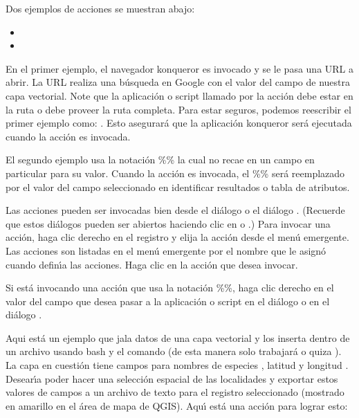 Dos ejemplos de acciones se muestran abajo:

\begin{itemize}
  \item {}
  \item {}
\end{itemize}

En el primer ejemplo, el navegador konqueror es invocado y  se le pasa una URL a 
abrir. La URL realiza una b\'usqueda en Google con el valor del campo 
de nuestra capa vectorial. Note que la aplicaci\'on o script llamado por la acci\'on
debe estar en la ruta o debe proveer la  ruta completa. Para estar seguros, podemos
reescribir el primer ejemplo como: . Esto asegurar\'a que la aplicaci\'on konqueror
ser\'a ejecutada cuando la acci\'on es invocada.

El segundo ejemplo usa la notaci\'on \%\% la cual no recae en un campo en particular
para su valor. Cuando la acci\'on es invocada, el \%\% ser\'a reemplazado por
el valor del campo seleccionado en identificar resultados o tabla de atributos.

\label{label_usingactions}
Las acciones pueden ser invocadas bien desde el di\'alogo  o el 
 di\'alogo . 
(Recuerde que estos di\'alogos pueden ser abiertos haciendo clic en
o
.)
Para invocar una acci\'on, 
haga clic derecho en el registro
y elija la acci\'on desde el men\'u emergente. Las acciones son listadas en el men\'u
emergente por el nombre que le asign\'o cuando defin\'{\i}a las acciones. Haga clic en la acci\'on
que desea invocar.

Si est\'a invocando una acci\'on que usa la notaci\'on \%\%, haga clic derecho en el
valor del campo que desea pasar a la aplicaci\'on o script en el di\'alogo  o en el
di\'alogo .

Aqui est\'a un ejemplo que jala datos de una capa vectorial y los inserta
dentro de un archivo usando bash y el comando  (de esta manera solo trabajar\'a
\nix o quiza \osx). La capa en cuesti\'on tiene campos para nombres de especies
, latitud  y longitud
. Desear\'{\i}a poder hacer
una selecci\'on espacial de las localidades y exportar estos valores de campos a
un archivo de texto para el registro seleccionado (mostrado en amarillo en el \'area de mapa de QGIS). Aqu\'{\i} est\'a
una acci\'on para lograr esto:

